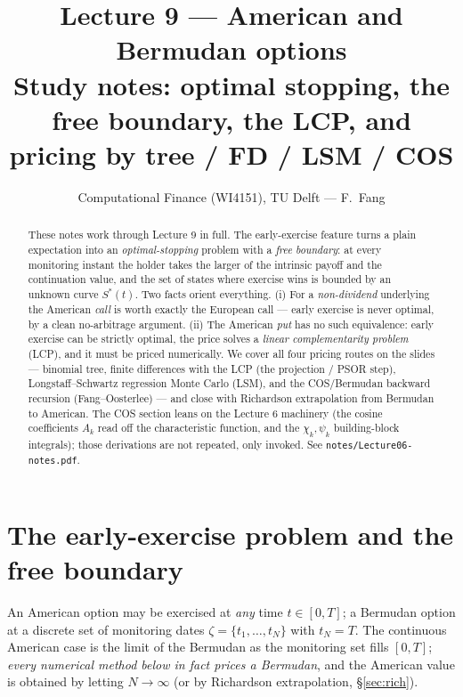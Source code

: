 \documentclass[11pt]{article}
\title{\textbf{Lecture 9 --- American and Bermudan options}\\[2pt]
\large Study notes: optimal stopping, the free boundary, the LCP, and pricing by tree / FD / LSM / COS}
\author{Computational Finance (WI4151), TU Delft --- F.\ Fang}
\date{}
\begin{document}
\maketitle
\vspace{-1.0em}

\begin{abstract}
\noindent These notes work through Lecture 9 in full. The early-exercise feature turns a plain expectation
into an \emph{optimal-stopping} problem with a \emph{free boundary}: at every monitoring instant the holder
takes the larger of the intrinsic payoff and the continuation value, and the set of states where exercise wins
is bounded by an unknown curve $S^\ast(t)$. Two facts orient everything. (i) For a \emph{non-dividend}
underlying the American \emph{call} is worth exactly the European call --- early exercise is never optimal, by
a clean no-arbitrage argument. (ii) The American \emph{put} has no such equivalence: early exercise can be
strictly optimal, the price solves a \emph{linear complementarity problem} (LCP), and it must be priced
numerically. We cover all four pricing routes on the slides --- binomial tree, finite differences with the
LCP (the projection / PSOR step), Longstaff--Schwartz regression Monte Carlo (LSM), and the COS/Bermudan
backward recursion (Fang--Oosterlee) --- and close with Richardson extrapolation from Bermudan to American.
The COS section leans on the Lecture 6 machinery (the cosine coefficients $A_k$ read off the characteristic
function, and the $\chi_k,\psi_k$ building-block integrals); those derivations are not repeated, only invoked.
See \texttt{notes/Lecture06-notes.pdf}.
\end{abstract}

\tableofcontents

\section{The early-exercise problem and the free boundary}\label{sec:problem}

An American option may be exercised at \emph{any} time $t\in[0,T]$; a Bermudan option at a discrete set of
monitoring dates $\zeta=\{t_1,\dots,t_N\}$ with $t_N=T$. The continuous American case is the limit of the
Bermudan as the monitoring set fills $[0,T]$; \emph{every numerical method below in fact prices a Bermudan},
and the American value is obtained by letting $N\to\infty$ (or by Richardson extrapolation, \S\ref{sec:rich}).
\end{document}

